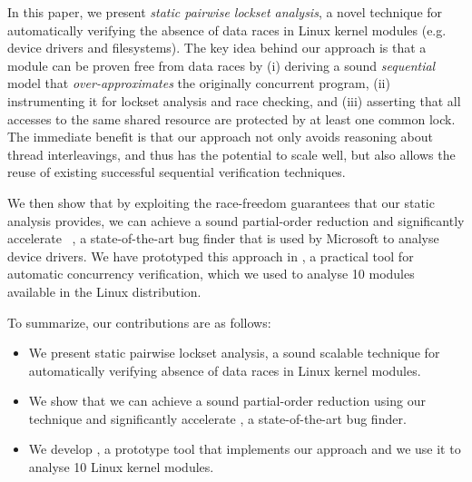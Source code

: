 In this paper, we present \emph{static pairwise lockset analysis}, a novel technique for automatically verifying the absence of data races in Linux kernel modules (e.g. device drivers and filesystems). The key idea behind our approach is that a module can be proven free from data races by (i) deriving a sound \emph{sequential} model that \emph{over-approximates} the originally concurrent program, (ii) instrumenting it for lockset analysis and race checking, and (iii) asserting that all accesses to the same shared resource are protected by at least one common lock. The immediate benefit is that our approach not only avoids reasoning about thread interleavings, and thus has the potential to scale well, but also allows the reuse of existing successful sequential verification techniques.

We then show that by exploiting the race-freedom guarantees that our static analysis provides, we can achieve a sound partial-order reduction and significantly accelerate \corral~\cite{lal2012solver}, a state-of-the-art bug finder that is used by Microsoft to analyse device drivers. We have prototyped this approach in \whoop, a practical tool for automatic concurrency verification, which we used to analyse 10 modules available in the Linux distribution.

To summarize, our contributions are as follows:
\begin{itemize}
\item We present static pairwise lockset analysis,  a sound scalable technique for automatically verifying absence of data races in Linux kernel modules.
\item We show that we can achieve a sound partial-order reduction using our technique and significantly accelerate \corral, a state-of-the-art bug finder.
\item We develop \whoop, a prototype tool that implements our approach and we use it to analyse 10 Linux kernel modules.
\end{itemize}